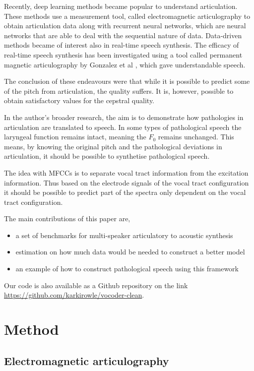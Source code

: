 \documentclass[a4paper]{article}
\begin{document}
Recently, deep learning methods became popular
to understand articulation. These methods use a measurement tool,
called electromagnetic articulography to obtain articulation data 
\cite{Aryal2016} \cite{Taguchi} \cite{Liu2018} along with recurrent
neural networks, which are neural networks that are able to deal with
the sequential nature of data. Data-driven methods became of interest also
in real-time speech synthesis. The efficacy of real-time speech synthesis
has been investigated using a tool called permanent magnetic articulography
by Gonzalez et al \cite{Gonzalez2017}, which gave understandable
speech.

The conclusion of these endeavours were that while it is possible to
predict some of the pitch from articulation, the quality suffers.
It is, however, possible to obtain satisfactory values for the
cepstral quality.



In the author's broader research, the aim is to demonstrate how pathologies in
articulation are translated to speech. In some types of pathological
speech the laryngeal function remains intact, meaning the \( F_0 \)
remains unchanged. This means, by knowing the original pitch and the
pathological deviations in articulation, it should be possible to
synthetise pathological speech.

The idea with MFCCs is to separate vocal tract information from the excitation
information. Thus based on the electrode signals of the vocal tract configuration
it should be possible to predict part of the spectra only dependent on the vocal
tract configuration.

The main contributions of this paper are,
\begin{itemize}
\item a set of benchmarks for multi-speaker articulatory to acoustic synthesis
\item estimation on how much data would be needed to construct a better model
\item an example of how to construct pathological speech using this framework
\end{itemize}

Our code is also available as a Github repository on the link
\url{https://github.com/karkirowle/vocoder-clean}.

\section{Method}
\subsection{Electromagnetic articulography}
\end{document}
